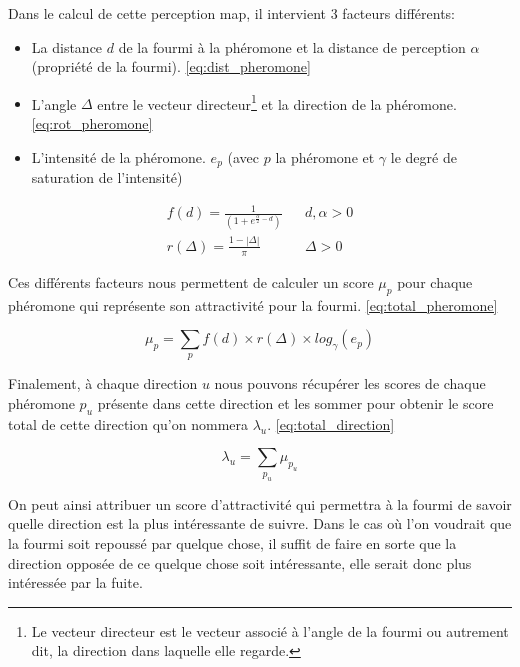 \documentclass{EPUProjetDi}
\begin{document}
Dans le calcul de cette perception map, il intervient 3 facteurs différents:
\begin{itemize}
    \item La distance $d$ de la fourmi à la phéromone et la distance de perception $\alpha$ (propriété de la fourmi). \eqref{eq:dist_pheromone}
    \item L'angle $\Delta$ entre le vecteur directeur\footnote{Le vecteur directeur est le vecteur associé à l'angle de la fourmi ou
    autrement dit, la direction dans laquelle elle regarde.} et la direction de la phéromone. \eqref{eq:rot_pheromone}
    \item L'intensité de la phéromone. $e_p$ (avec $p$ la phéromone et $\gamma$ le degré de saturation de l'intensité)
\end{itemize}

\begin{subequations}
\begin{align}
    f(d)=\frac{1}{(1 + e^{\frac{\alpha}{2} - d})} && d,\alpha > 0 \label{eq:dist_pheromone}\\
    r(\Delta)= \frac{1-\left\lvert \Delta\right\rvert}{\pi} && \Delta \label{eq:rot_pheromone}> 0
\end{align}
\end{subequations}

Ces différents facteurs nous permettent de calculer un score $\mu_{p}$ pour chaque phéromone qui représente 
son attractivité pour la fourmi. \eqref{eq:total_pheromone}

\begin{equation}
    \mu_{p} = \sum_{p}{} f(d) \times r(\Delta) \times log_{\gamma}(e_{p})
    \label{eq:total_pheromone}
\end{equation}

Finalement, à chaque direction $u$ nous pouvons récupérer les scores de chaque phéromone $p_{u}$ présente dans cette direction
et les sommer pour obtenir le score total de cette direction qu'on nommera $\lambda_{u}$. \eqref{eq:total_direction}

\begin{equation}
    \lambda_{u} = \sum_{p_{u}}{} \mu_{p_{u}}
    \label{eq:total_direction}
\end{equation}

On peut ainsi attribuer un score d'attractivité qui permettra à la fourmi de savoir quelle direction est la plus intéressante de suivre.
Dans le cas où l'on voudrait que la fourmi soit repoussé par quelque chose, il suffit de faire en sorte que la direction opposée de ce quelque chose
soit intéressante, elle serait donc plus intéressée par la fuite. 
\end{document}
